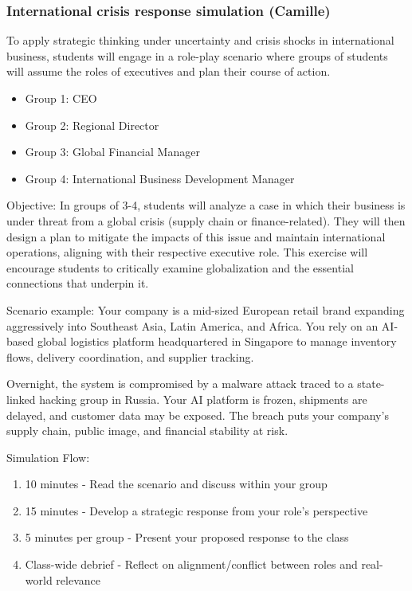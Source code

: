 \documentclass[
  11pt,
]{article}
\providecommand{\tightlist}{%
  \setlength{\itemsep}{0pt}\setlength{\parskip}{0pt}}
\begin{document}
\subsubsection{International crisis response simulation
(Camille)}\label{international-crisis-response-simulation-camille}

To apply strategic thinking under uncertainty and crisis shocks in
international business, students will engage in a role-play scenario
where groups of students will assume the roles of executives and plan
their course of action.

\begin{itemize}
\tightlist
\item
  Group 1: CEO
\item
  Group 2: Regional Director
\item
  Group 3: Global Financial Manager
\item
  Group 4: International Business Development Manager
\end{itemize}

Objective: In groups of 3-4, students will analyze a case in which their
business is under threat from a global crisis (supply chain or
finance-related). They will then design a plan to mitigate the impacts
of this issue and maintain international operations, aligning with their
respective executive role. This exercise will encourage students to
critically examine globalization and the essential connections that
underpin it.

Scenario example: Your company is a mid-sized European retail brand
expanding aggressively into Southeast Asia, Latin America, and Africa.
You rely on an AI-based global logistics platform headquartered in
Singapore to manage inventory flows, delivery coordination, and supplier
tracking.

Overnight, the system is compromised by a malware attack traced to a
state-linked hacking group in Russia. Your AI platform is frozen,
shipments are delayed, and customer data may be exposed. The breach puts
your company's supply chain, public image, and financial stability at
risk.

Simulation Flow:

\begin{enumerate}
\def\labelenumi{\arabic{enumi}.}
\tightlist
\item
  10 minutes - Read the scenario and discuss within your group
\item
  15 minutes - Develop a strategic response from your role's perspective
\item
  5 minutes per group - Present your proposed response to the class
\item
  Class-wide debrief - Reflect on alignment/conflict between roles and
  real-world relevance
\end{enumerate}
\end{document}
